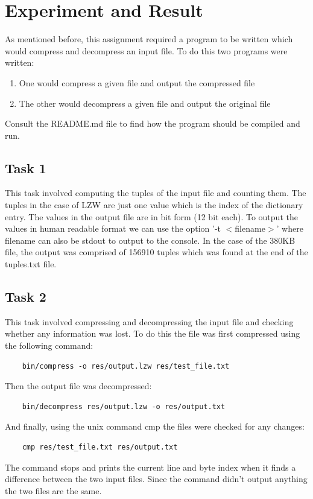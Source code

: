 \documentclass[]{article}
\newcommand\tab[1][1cm]{\hspace*{#1}}
\begin{document}
\section{Experiment and Result}
\tab As mentioned before, this assignment required a program to be written which would compress
and decompress an input file. To do this two programs were written:
\begin{enumerate}
	\item One would compress a given file and output the compressed file
	\item The other would decompress a given file and output the original file
\end{enumerate}
Consult the README.md file to find how the program should be compiled and
run.

\subsection{Task 1}
\tab This task involved computing the tuples of the input file and 
counting them. The tuples in the case of LZW are just one value
which is the index of the dictionary entry. The values in the output
file are in bit form (12 bit each). To output the values in human
readable format we can use the option '-t $<$filename$>$'
where filename can also be stdout to output to the console.
In the case of the 380KB file, the output was comprised of 156910 
tuples which was found at the end of the tuples.txt file.

\subsection{Task 2}
\tab This task involved compressing and decompressing the input file
and checking whether any information was lost. To do this the file
was first compressed using the following command:
\begin{verbatim}
	bin/compress -o res/output.lzw res/test_file.txt
\end{verbatim}
\tab Then the output file was decompressed:
\begin{verbatim}
	bin/decompress res/output.lzw -o res/output.txt
\end{verbatim}
\tab And finally, using the unix command cmp the files were checked for 
any changes:
\begin{verbatim}
	cmp res/test_file.txt res/output.txt
\end{verbatim}
\tab The command stops and prints the current line and byte index when it finds a 
difference between the two input files. Since the command didn't 
output anything the two files are the same.
\end{document}
